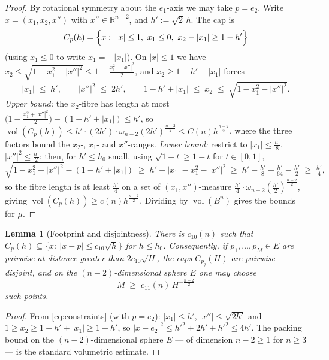 \documentclass[11pt]{article}
\newtheorem{lemma}[theorem]{Lemma}
\newcommand{\R}{\mathbb{R}}
\newcommand{\vol}{\operatorname{vol}}
\begin{document}
\begin{proof}
By rotational symmetry about the $e_1$-axis we may take $p=e_2$.  Write
$x=(x_1,x_2,x'')$ with $x''\in\R^{n-2}$, and $h':=\sqrt2\,h$.  The cap is
\[
C_p(h)=\Bigl\{x:\ |x|\le1,\ x_1\le0,\ x_2-|x_1|\ge1-h'\Bigr\}
\]
(using $x_1\le0$ to write $x_1=-|x_1|$).  On $|x|\le1$ we have
$x_2\le\sqrt{1-x_1^2-|x''|^2}\le1-\tfrac{x_1^2+|x''|^2}2$, and
$x_2\ge1-h'+|x_1|$ forces
\begin{equation}\label{eq:constraints}
|x_1|\;\le\;h',\qquad |x''|^2\;\le\;2h',\qquad
1-h'+|x_1|\;\le\;x_2\;\le\;\sqrt{1-x_1^2-|x''|^2}.
\end{equation}
\emph{Upper bound:} the $x_2$-fibre has length at most
$\bigl(1-\tfrac{x_1^2+|x''|^2}2\bigr)-(1-h'+|x_1|)\le h'$, so
$\vol(C_p(h))\le h'\cdot(2h')\cdot\omega_{n-2}(2h')^{\frac{n-2}2}
\le C(n)h^{\frac{n+2}2}$, where the three factors bound the
$x_2$-, $x_1$- and $x''$-ranges.  \emph{Lower bound:} restrict to
$|x_1|\le\frac{h'}{8}$, $|x''|^2\le\frac{h'}2$; then, for
$h'\le h_0$ small, using $\sqrt{1-t}\ge1-t$ for $t\in[0,1]$,
\[
\sqrt{1-x_1^2-|x''|^2}-(1-h'+|x_1|)
\;\ge\;h'-|x_1|-x_1^2-|x''|^2
\;\ge\;h'-\tfrac{h'}8-\tfrac{h'}{64}-\tfrac{h'}2\;\ge\;\tfrac{h'}4,
\]
so the fibre length is at least $\frac{h'}4$ on a set of
$(x_1,x'')$-measure $\frac{h'}4\cdot\omega_{n-2}(\frac{h'}2)^{\frac{n-2}2}$,
giving $\vol(C_p(h))\ge c(n)h^{\frac{n+2}2}$.  Dividing by
$\vol(B^n)$ gives the bounds for $\mu$.
\end{proof}

\begin{lemma}[Footprint and disjointness]\label{lem:disjoint}
There is $c_{10}(n)$ such that
$C_p(h)\subseteq\{x:\ |x-p|\le c_{10}\sqrt h\}$ for $h\le h_0$.  Consequently,
if $p_1,\dots,p_M\in E$ are pairwise at distance greater than
$2c_{10}\sqrt H$, the caps $C_{p_j}(H)$ are pairwise disjoint, and on the
$(n-2)$-dimensional sphere $E$ one may choose
\begin{equation}\label{eq:M}
M\;\ge\;c_{11}(n)\,H^{-\frac{n-2}2}
\end{equation}
such points.
\end{lemma}

\begin{proof}
From \eqref{eq:constraints} (with $p=e_2$): $|x_1|\le h'$,
$|x''|\le\sqrt{2h'}$ and $1\ge x_2\ge1-h'+|x_1|\ge1-h'$, so
$|x-e_2|^2\le h'^2+2h'+h'^2\le4h'$.  The packing bound on the
$(n-2)$-dimensional sphere $E$ --- of dimension $n-2\ge1$ for $n\ge3$ --- is
the standard volumetric estimate.
\end{proof}
\end{document}

